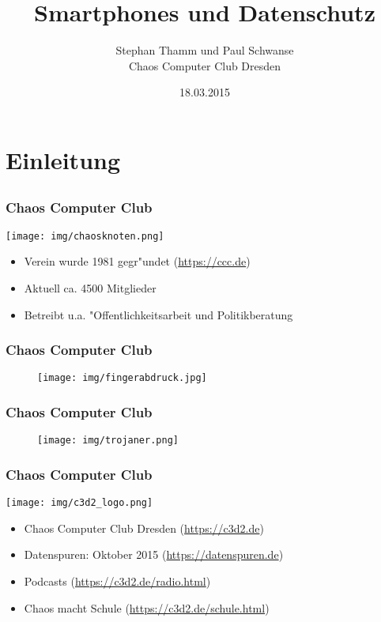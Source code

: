 \documentclass[12pt]{beamer}
\title{Smartphones und Datenschutz}
\author{\small Stephan Thamm und Paul Schwanse\\\large Chaos Computer Club Dresden}
\date{18.03.2015}
\begin{document}
\maketitle


\section{Einleitung}
\subsection{}

\begin{frame}
    \frametitle{Chaos Computer Club}
    \begin{center}
	\texttt{[image: img/chaosknoten.png]}
    \end{center}	
    \begin{itemize}
      \item<1-> Verein wurde 1981 gegr"undet (\url{https://ccc.de})          
      \item<2-> Aktuell ca. 4500 Mitglieder
      \item<3-> Betreibt u.a. "Offentlichkeitsarbeit und Politikberatung      
    \end{itemize}
\end{frame}

\begin{frame}
  \frametitle{Chaos Computer Club}
  \begin{figure}
    \texttt{[image: img/fingerabdruck.jpg]}
  \end{figure}
\end{frame}

\begin{frame}
  \frametitle{Chaos Computer Club}
  \begin{figure}
    \texttt{[image: img/trojaner.png]}
  \end{figure}
\end{frame}

\begin{frame}
    \frametitle{Chaos Computer Club}
    \begin{center}
	\texttt{[image: img/c3d2\_logo.png]}
    \end{center}
    \begin{itemize}
      \item<1-> Chaos Computer Club Dresden (\url{https://c3d2.de})          
      \item<2-> Datenspuren: Oktober 2015 (\url{https://datenspuren.de})
      \item<3-> Podcasts (\url{https://c3d2.de/radio.html})
      \item<4-> Chaos macht Schule (\url{https://c3d2.de/schule.html})
    \end{itemize}
\end{frame}
\end{document}
